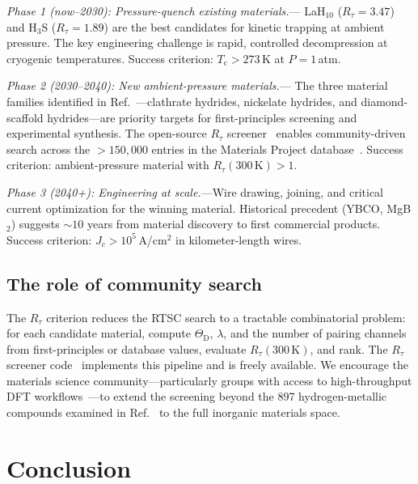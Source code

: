 \documentclass[prl,twocolumn,superscriptaddress,longbibliography,floatfix]{revtex4-2}
\newcommand{\tauasym}{\tau}
\newcommand{\Rtau}{R_{\tauasym}}
\newcommand{\Tc}{T_{\mathrm{c}}}
\newcommand{\ThetaD}{\Theta_{\mathrm{D}}}
\begin{document}
\emph{Phase 1 (now--2030): Pressure-quench existing materials.}---
LaH$_{10}$ ($\Rtau = 3.47$) and H$_3$S ($\Rtau = 1.89$)
are the best candidates for kinetic trapping at ambient
pressure.  The key engineering challenge is rapid, controlled
decompression at cryogenic temperatures.  Success criterion:
$\Tc > 273\,$K at $P = 1\,$atm.

\emph{Phase 2 (2030--2040): New ambient-pressure materials.}---
The three material families identified in
Ref.~\cite{HuangRTSC2026}---clathrate hydrides, nickelate
hydrides, and diamond-scaffold hydrides---are priority targets
for first-principles screening and experimental synthesis.
The open-source $\Rtau$ screener~\cite{rtau_code} enables
community-driven search across the $> 150{,}000$ entries in
the Materials Project database~\cite{Jain2013}.  Success
criterion: ambient-pressure material with $\Rtau(300\,\mathrm{K}) > 1$.

\emph{Phase 3 (2040+): Engineering at scale.}---Wire drawing,
joining, and critical current optimization for the winning
material.  Historical precedent (YBCO, MgB$_2$) suggests
$\sim 10$ years from material discovery to first commercial
products.  Success criterion: $J_c > 10^5\,$A/cm$^2$ in
kilometer-length wires.

\subsection{The role of community search}

The $\Rtau$ criterion reduces the RTSC search to a tractable
combinatorial problem: for each candidate material, compute
$\ThetaD$, $\lambda$, and the number of pairing channels from
first-principles or database values, evaluate $\Rtau(300\,\mathrm{K})$,
and rank.  The $\Rtau$ screener code~\cite{rtau_code}
implements this pipeline and is freely available.  We
encourage the materials science community---particularly
groups with access to high-throughput DFT
workflows~\cite{Curtarolo2012}---to extend the screening
beyond the 897 hydrogen-metallic compounds examined in
Ref.~\cite{HuangRTSC2026} to the full inorganic materials
space.

\section{Conclusion}
\label{sec:conclusion}
\end{document}
